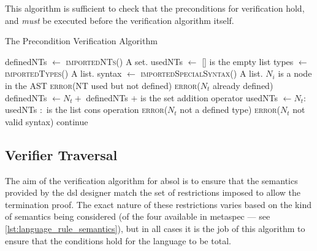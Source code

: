 This algorithm is sufficient to check that the preconditions for verification hold, and \textit{must} be executed before the verification algorithm itself.

\begin{breakablealgorithm}
\caption{The Precondition Verification Algorithm}
\label{alg:the_precondition_verification_algorithm}
\begin{algorithmic}
\State
\State definedNTs $\gets$ \textsc{importedNTs}()
\Comment A set.
\State usedNTs $\gets$ []
\Comment [] is the empty list
\State types $\gets$ \textsc{importedTypes}()
\Comment A list.
\State syntax $\gets$ \textsc{importedSpecialSyntax}()
\Comment A list.
\State
{}
\Comment $N_i$ is a node in the AST
    \State {}
\EndFor
\State
{}
        \State \textsc{error}(NT used but not defined)
    \EndIf
\EndFor
\State
{}
                \State \textsc{error}($N_t$ already defined)
            \Else
                \State definedNTs $\gets N_t +$ definedNTs
                \Comment $+$ is the set addition operator
            \EndIf
        \Else
            \State usedNTs $\gets N_t : $ usedNTs
            \Comment $:$ is the list cons operation
        \EndIf
        \State \textsc{error}($N_t$ not a defined type)
        \State \textsc{error}($N_t$ not valid syntax)
    \Else
        \State continue
    \EndIf
\EndFunction
\end{algorithmic}
\end{breakablealgorithm}



\subsection{Verifier Traversal} %
\label{sub:verifier_traversal}
The aim of the verification algorithm for \gls{absol} is to ensure that the semantics provided by the \gls{dsl} designer match the set of restrictions imposed to allow the termination proof. 
The exact nature of these restrictions varies based on the kind of semantics being considered (of the four available in \gls{metaspec} --- see \autoref{lst:language_rule_semantics}), but in all cases it is the job of this algorithm to ensure that the conditions hold for the language to be total. \\

